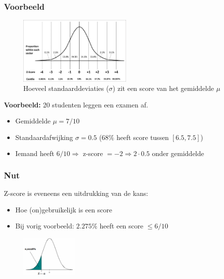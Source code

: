 \documentclass{article}
\begin{document}
\subsubsection{Voorbeeld}

\begin{figure}[H]
    \centering
    \includegraphics[width=0.5\textwidth]{z-score.png}
    \caption{Hoeveel standaarddeviaties ($\sigma$) zit een score van het gemiddelde $\mu$}
\end{figure}

\textbf{Voorbeeld:} 20 studenten leggen een examen af.

\begin{itemize}
    \item Gemiddelde $\mu = 7/10$
    \item Standaardafwijking $\sigma = 0.5$ ($68\%$ heeft score tussen $[6.5, 7.5]$)
    \item Iemand heeft $6/10 \Rightarrow$ z-score $= -2 \Rightarrow 2\cdot 0.5$ onder gemiddelde 
\end{itemize}

\subsubsection{Nut}

Z-score is eveneens een uitdrukking van de kans:

\begin{itemize}
    \item Hoe (on)gebruikelijk is een score
    \item Bij vorig voorbeeld: $2.275\%$ heeft een score $\leq 6/10$
\end{itemize}

\begin{figure}[H]
    \centering
    \includegraphics[width=0.25\textwidth]{z-score-nut.png}
\end{figure}
\end{document}
